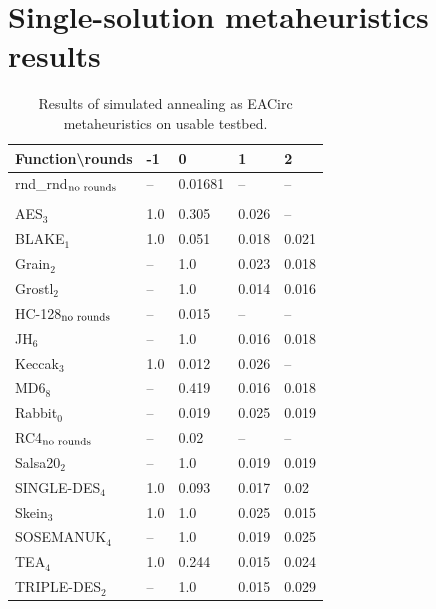 \documentclass[
  print, %
  Table,   %
  nolof,     %
  nolot,     %
  11pt, %
  oneside  %
]{fithesis3}
\newcommand{\fd}{\cellcolor{red!13}}
\newcommand{\fn}{\cellcolor{green!13}}
\begin{document}
\section{Single-solution metaheuristics results}
\label{sec:app-ss-res}

\begin{table}[H]
\centering
\begin{tabular}{l|l l l l}
Function\textbackslash{}rounds & -1 & 0 & 1 & 2\\ \hline
rnd\_rnd$_{\textnormal{no rounds}}$ & -- & \fn{}0.01681& -- & --    \\\\
AES$_{3}$        & \fd{}1.0   & \fd{}0.305 & \fn{}0.026 & \fn{}--   \\
BLAKE$_{1}$      & \fd{}1.0   & \fd{}0.051 & \fn{}0.018 & \fn{}0.021\\
Grain$_{2}$      & \fd{}--    & \fd{}1.0   & \fn{}0.023 & \fn{}0.018\\
Grostl$_{2}$     & \fd{}--    & \fd{}1.0   & \fn{}0.014 & \fn{}0.016\\
HC-128$_{\textnormal{no rounds}}$& -- & \fn{}0.015 & -- & --        \\
JH$_{6}$         & \fd{}--    & \fd{}1.0   & \fn{}0.016 & \fn{}0.018\\
Keccak$_{3}$     & \fd{}1.0   & \fn{}0.012 & \fn{}0.026 & \fn{}--   \\
MD6$_{8}$        & \fd{}--    & \fd{}0.419 & \fn{}0.016 & \fn{}0.018\\
Rabbit$_{0}$     &      --    & \fn{}0.019 & \fn{}0.025 & \fn{}0.019\\
RC4$_{\textnormal{no rounds}}$& -- & \fn{}0.02  & --    & --        \\
Salsa20$_{2}$    & \fd{}--    & \fd{}1.0   & \fn{}0.019 & \fn{}0.019\\
SINGLE-DES$_{4}$ & \fd{}1.0   & \fd{}0.093 & \fn{}0.017 & \fn{}0.02 \\
Skein$_{3}$      & \fd{}1.0   & \fd{}1.0   & \fn{}0.025 & \fn{}0.015\\
SOSEMANUK$_{4}$  & \fd{}--    & \fd{}1.0   & \fn{}0.019 & \fn{}0.025\\
TEA$_{4}$        & \fd{}1.0   & \fd{}0.244 & \fn{}0.015 & \fn{}0.024\\
TRIPLE-DES$_{2}$ & \fd{}--    & \fd{}1.0   & \fn{}0.015 & \fn{}0.029
\end{tabular}
\caption{Results of simulated annealing as EACirc metaheuristics on usable testbed.}
\label{table:res-usable-sa}
\end{table}
\end{document}
